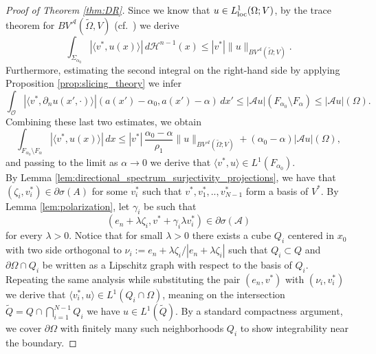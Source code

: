 \documentclass[11pt,reqno]{amsart}
\theoremstyle{plain}
\theoremstyle{definition}
\theoremstyle{remark}
\numberwithin{equation}{section}
\renewcommand{\H}{\mathcal{H}}
\newcommand{\A}{\mathcal{A}}
\newcommand{\1}{\mathbbm{1}} %
\newcommand{\loc}{\textnormal{loc}}
\begin{document}
\begin{proof}[Proof of Theorem \ref{thm:DR}]
    Since we know that $u \in L^1_\loc(\Omega; V)$, by the trace theorem for $BV^\A(\widetilde \Omega, V)$ (cf.\ \cite{BDG20}) we derive
    \begin{equation*}
        \int_{\Sigma_{\alpha_0}} |\langle v^*,  u(x) \rangle| \, d\H^{n-1}(x) \le |v^*| \|u\|_{BV^\A(\widetilde{\Omega};V)}.
    \end{equation*}
    Furthermore, estimating the second integral on the right-hand side by applying Proposition \ref{prop:slicing_theory} we infer
    \begin{equation*}
        \int_\mathcal{O} |\langle v^*, \partial_n u(x',\cdot) \rangle|(a(x')-\alpha_0, a(x')-\alpha) \, dx' \le |\A u|(F_{\alpha_0} \setminus F_\alpha) \le |\A u|(\Omega).
    \end{equation*}
    Combining these last two estimates, we obtain
    \begin{equation*}
        \int_{F_{\alpha_0} \setminus F_\alpha} |\langle v^*,  u(x) \rangle| \, dx \le |v^*| \, \frac{\alpha_0 - \alpha}{\rho_1} \|u\|_{BV^\A(\widetilde{\Omega}; V)} + (\alpha_0 - \alpha) |\A u|(\Omega),
    \end{equation*}
    and passing to the limit as $\alpha \to 0$ we derive that $\langle v^*,  u \rangle \in L^1(F_{\alpha_0})$.
    \\[0.5em]
    By Lemma \ref{lem:directional_spectrum_surjectivity_projections}, we have that $(\zeta_i, v_i^*) \in \partial \sigma (A)$ for some $v_i^*$ such that $v^*, v_1^*, .., v_{N-1}^*$ form a basis of $V^*$. By Lemma \ref{lem:polarization}, let $\gamma_i$ be such that 
    \[
        (e_n + \lambda \zeta_i, v^* + \gamma_i \lambda v_i^*) \in \partial \sigma(\A)
    \]
    for every $\lambda > 0$. Notice that for small $\lambda > 0$ there exists a cube $Q_i$ centered in $x_0$ with two side orthogonal to $\nu_i := e_n + \lambda \zeta_i/|e_n + \lambda \zeta_i|$ such that $Q_i \subset Q$ and $\partial \Omega \cap Q_i$ be written as a Lipschitz graph with respect to the basis of $Q_i$. Repeating the same analysis while substituting the pair $(e_n, v^*)$ with $(\nu_i, v_i^*)$ we derive that $\langle v_i^*, u \rangle \in L^1(Q_i \cap \Omega)$, meaning on the intersection $\tilde Q = Q \cap \bigcap_{i = 1}^{N - 1} Q_i$ we have $u \in L^1(\tilde Q)$. By a standard compactness argument, we cover $\partial \Omega$ with finitely many such neighborhoods $Q_i$ to show integrability near the boundary.
\end{proof}

\end{document}
